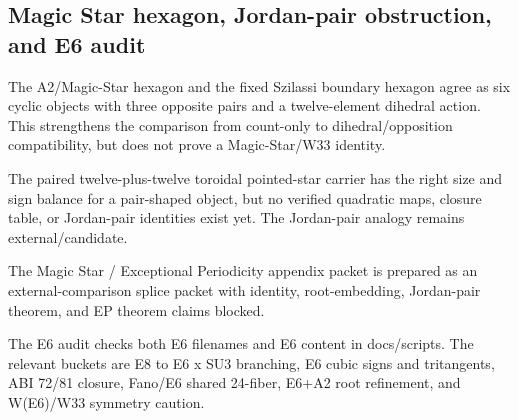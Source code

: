 \subsection{Magic Star hexagon, Jordan-pair obstruction, and E6 audit}
\label{sec:bt1543-bt1546-magic-star-e6-audit}

The A2/Magic-Star hexagon and the fixed Szilassi boundary hexagon agree as six cyclic objects with three opposite pairs and a twelve-element dihedral action.  This strengthens the comparison from count-only to dihedral/opposition compatibility, but does not prove a Magic-Star/W33 identity.

The paired twelve-plus-twelve toroidal pointed-star carrier has the right size and sign balance for a pair-shaped object, but no verified quadratic maps, closure table, or Jordan-pair identities exist yet.  The Jordan-pair analogy remains external/candidate.

The Magic Star / Exceptional Periodicity appendix packet is prepared as an external-comparison splice packet with identity, root-embedding, Jordan-pair theorem, and EP theorem claims blocked.

The E6 audit checks both E6 filenames and E6 content in docs/scripts.  The relevant buckets are E8 to E6 x SU3 branching, E6 cubic signs and tritangents, ABI 72/81 closure, Fano/E6 shared 24-fiber, E6+A2 root refinement, and W(E6)/W33 symmetry caution.
